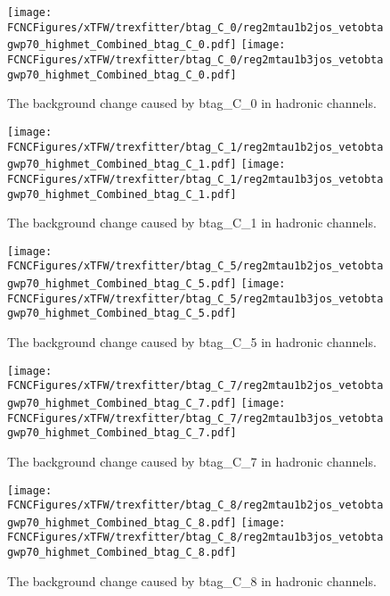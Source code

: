 \begin{figure}[H]
\centering
\texttt{[image: \\FCNCFigures/xTFW/trexfitter/btag\_C\_0/reg2mtau1b2jos\_vetobtagwp70\_highmet\_Combined\_btag\_C\_0.pdf]}
\texttt{[image: \\FCNCFigures/xTFW/trexfitter/btag\_C\_0/reg2mtau1b3jos\_vetobtagwp70\_highmet\_Combined\_btag\_C\_0.pdf]}
\caption{The background change caused by btag\_C\_0 in hadronic channels.}
\label{fig:xTFW_btag_C_0}
\end{figure}

\begin{figure}[H]
\centering
\texttt{[image: \\FCNCFigures/xTFW/trexfitter/btag\_C\_1/reg2mtau1b2jos\_vetobtagwp70\_highmet\_Combined\_btag\_C\_1.pdf]}
\texttt{[image: \\FCNCFigures/xTFW/trexfitter/btag\_C\_1/reg2mtau1b3jos\_vetobtagwp70\_highmet\_Combined\_btag\_C\_1.pdf]}
\caption{The background change caused by btag\_C\_1 in hadronic channels.}
\label{fig:xTFW_btag_C_1}
\end{figure}

\begin{figure}[H]
\centering
\texttt{[image: \\FCNCFigures/xTFW/trexfitter/btag\_C\_5/reg2mtau1b2jos\_vetobtagwp70\_highmet\_Combined\_btag\_C\_5.pdf]}
\texttt{[image: \\FCNCFigures/xTFW/trexfitter/btag\_C\_5/reg2mtau1b3jos\_vetobtagwp70\_highmet\_Combined\_btag\_C\_5.pdf]}
\caption{The background change caused by btag\_C\_5 in hadronic channels.}
\label{fig:xTFW_btag_C_5}
\end{figure}

\begin{figure}[H]
\centering
\texttt{[image: \\FCNCFigures/xTFW/trexfitter/btag\_C\_7/reg2mtau1b2jos\_vetobtagwp70\_highmet\_Combined\_btag\_C\_7.pdf]}
\texttt{[image: \\FCNCFigures/xTFW/trexfitter/btag\_C\_7/reg2mtau1b3jos\_vetobtagwp70\_highmet\_Combined\_btag\_C\_7.pdf]}
\caption{The background change caused by btag\_C\_7 in hadronic channels.}
\label{fig:xTFW_btag_C_7}
\end{figure}

\begin{figure}[H]
\centering
\texttt{[image: \\FCNCFigures/xTFW/trexfitter/btag\_C\_8/reg2mtau1b2jos\_vetobtagwp70\_highmet\_Combined\_btag\_C\_8.pdf]}
\texttt{[image: \\FCNCFigures/xTFW/trexfitter/btag\_C\_8/reg2mtau1b3jos\_vetobtagwp70\_highmet\_Combined\_btag\_C\_8.pdf]}
\caption{The background change caused by btag\_C\_8 in hadronic channels.}
\label{fig:xTFW_btag_C_8}
\end{figure}

